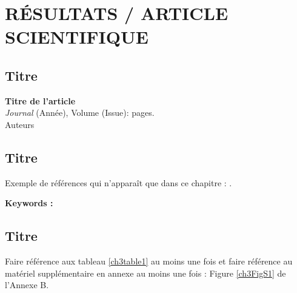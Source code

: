 \chapter{\textbf{RÉSULTATS / ARTICLE SCIENTIFIQUE}} 

\section{Titre}
\lipsum[10]
\vfill{}
\pagebreak

\begin{center}

\textbf{Titre de l'article} \\
\textit{Journal} (Année), Volume (Issue): pages. \\
Auteurs 
\end{center}

\section{Titre}
Exemple de références qui n'apparaît que dans ce chapitre : \cite{Stearns1992}. 

\lipsum[2]

\vfill{}
\textbf{Keywords :} 
\pagebreak

\section{Titre}

Faire référence aux tableau \ref{ch3table1} au moins une fois et faire référence au matériel supplémentaire en annexe au moins une fois : Figure \ref{ch3FigS1} de l'Annexe B. 





\lipsum[2]




\singlespacing
{\renewcommand{\bibname}{References}
\renewcommand{\bibsection}{\section{\bibname}}
}
 

